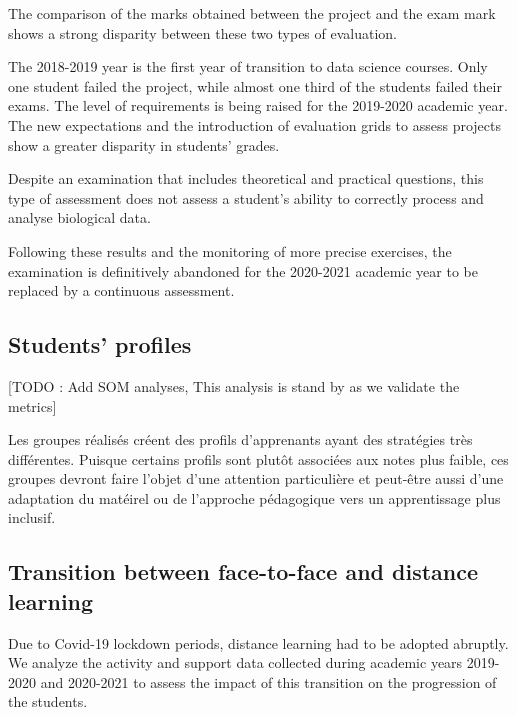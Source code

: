 \documentclass[
]{article}
\begin{document}
The comparison of the marks obtained between the project and the exam
mark shows a strong disparity between these two types of evaluation.

The 2018-2019 year is the first year of transition to data science
courses. Only one student failed the project, while almost one third of
the students failed their exams. The level of requirements is being
raised for the 2019-2020 academic year. The new expectations and the
introduction of evaluation grids to assess projects show a greater
disparity in students' grades.

Despite an examination that includes theoretical and practical
questions, this type of assessment does not assess a student's ability
to correctly process and analyse biological data.

Following these results and the monitoring of more precise exercises,
the examination is definitively abandoned for the 2020-2021 academic
year to be replaced by a continuous assessment.

\hypertarget{students-profiles}{%
\subsection{Students' profiles}\label{students-profiles}}

{[}TODO : Add SOM analyses, This analysis is stand by as we validate the
metrics{]}

Les groupes réalisés créent des profils d'apprenants ayant des
stratégies très différentes. Puisque certains profils sont plutôt
associées aux notes plus faible, ces groupes devront faire l'objet d'une
attention particulière et peut-être aussi d'une adaptation du matéirel
ou de l'approche pédagogique vers un apprentissage plus inclusif.

\hypertarget{transition-between-face-to-face-and-distance-learning}{%
\subsection{Transition between face-to-face and distance
learning}\label{transition-between-face-to-face-and-distance-learning}}

Due to Covid-19 lockdown periods, distance learning had to be adopted
abruptly. We analyze the activity and support data collected during
academic years 2019-2020 and 2020-2021 to assess the impact of this
transition on the progression of the students.
\end{document}
